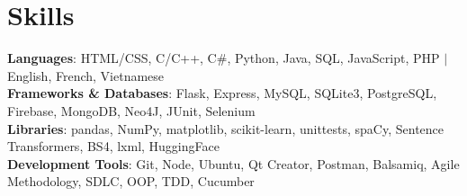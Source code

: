 \documentclass[letterpaper,11pt]{article}
\begin{document}
\section{\textbf{\Large Skills}}
  \begin{itemize}[leftmargin=0.15in, label={}]
    \small{
    \item{
    \textbf{Languages}{: HTML/CSS, C/C++, C\#, Python, Java, SQL, JavaScript, PHP $|$ English, French, Vietnamese} \\
    \textbf{Frameworks \& Databases}{: Flask, Express, MySQL, SQLite3, PostgreSQL, Firebase, MongoDB, Neo4J, JUnit, Selenium} \\
    \textbf{Libraries}{: pandas, NumPy, matplotlib, scikit-learn, unittests, spaCy, Sentence Transformers, BS4, lxml, HuggingFace } \\
    \textbf{Development Tools}{: Git, Node, Ubuntu, Qt Creator, Postman, Balsamiq, Agile Methodology, SDLC, OOP, TDD, Cucumber} \\
    }}
  \end{itemize}
\end{document}
